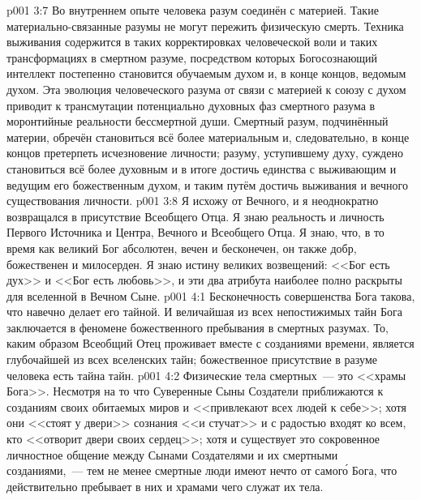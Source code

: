 \vs p001 3:7 \pc Во внутреннем опыте человека разум соединён с материей. Такие материально\hyp{}связанные разумы не могут пережить физическую смерть. Техника выживания содержится в таких корректировках человеческой воли и таких трансформациях в смертном разуме, посредством которых Богосознающий интеллект постепенно становится обучаемым духом и, в конце концов, ведомым духом. Эта эволюция человеческого разума от связи с материей к союзу с духом приводит к трансмутации потенциально духовных фаз смертного разума в моронтийные реальности бессмертной души. Смертный разум, подчинённый материи, обречён становиться всё более материальным и, следовательно, в конце концов претерпеть исчезновение личности; разуму, уступившему духу, суждено становиться всё более духовным и в итоге достичь единства с выживающим и ведущим его божественным духом, и таким путём достичь выживания и вечного существования личности.
\vs p001 3:8 Я исхожу от Вечного, и я неоднократно возвращался в присутствие Всеобщего Отца. Я знаю реальность и личность Первого Источника и Центра, Вечного и Всеобщего Отца. Я знаю, что, в то время как великий Бог абсолютен, вечен и бесконечен, он также добр, божественен и милосерден. Я знаю истину великих возвещений: <<Бог есть дух>> и <<Бог есть любовь>>, и эти два атрибута наиболее полно раскрыты для вселенной в Вечном Сыне.
\vs p001 4:1 Бесконечность совершенства Бога такова, что навечно делает его тайной. И величайшая из всех непостижимых тайн Бога заключается в феномене божественного пребывания в смертных разумах. То, каким образом Всеобщий Отец проживает вместе с созданиями времени, является глубочайшей из всех вселенских тайн; божественное присутствие в разуме человека есть тайна тайн.
\vs p001 4:2 Физические тела смертных~--- это <<храмы Бога>>. Несмотря на то что Суверенные Сыны Создатели приближаются к созданиям своих обитаемых миров и <<привлекают всех людей к себе>>; хотя они <<стоят у двери>> сознания <<и стучат>> и с радостью входят ко всем, кто <<отворит двери своих сердец>>; хотя и существует это сокровенное личностное общение между Сынами Создателями и их смертными созданиями,~--- тем не менее смертные люди имеют нечто от самог\'о Бога, что действительно пребывает в них и храмами чего служат их тела.

